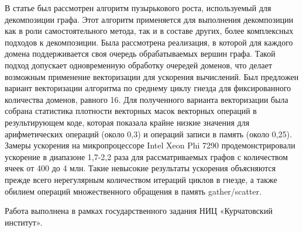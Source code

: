 \documentclass[
11pt,%
tightenlines,%
twoside,%
onecolumn,%
nofloats,%
nobibnotes,%
nofootinbib,%
superscriptaddress,%
noshowpacs,%
centertags]%
{revtex4}
\begin{document}
В статье был рассмотрен алгоритм пузырькового роста, используемый для декомпозиции графа.
Этот алгоритм применяется для выполнения декомпозиции как в роли самостоятельного метода, так и в составе других, более комплексных подходов к декомпозиции.
Была рассмотрена реализация, в которой для каждого домена поддерживается своя очередь обрабатываемых вершин графа.
Такой подход допускает одновременную обработку очередей доменов, что делает возможным применение векторизации для ускорения вычислений.
Был предложен вариант векторизации алгоритма по среднему циклу гнезда для фиксированного количества доменов, равного 16.
Для полученного варианта векторизации была собрана статистика плотности векторных масок векторных операций в результирующем коде, которая показала крайне низкие значения для арифметических операций (около 0,3) и операций записи в память (около 0,25).
Замеры ускорения на микропроцессоре Intel Xeon Phi 7290 продемонстрировали ускорение в диапазоне 1,7-2,2 раза для рассматриваемых графов с количеством ячеек от 400 до 4 млн.
Такие невысокие результаты ускорения объясняются прежде всего нерегулярным количеством итераций циклов в гнезде, а также обилием операций множественного обращения в память gather/scatter.

\begin{acknowledgments}
Работа выполнена в рамках государственного задания НИЦ «Курчатовский институт».
\end{acknowledgments}

%
%
\end{document}
